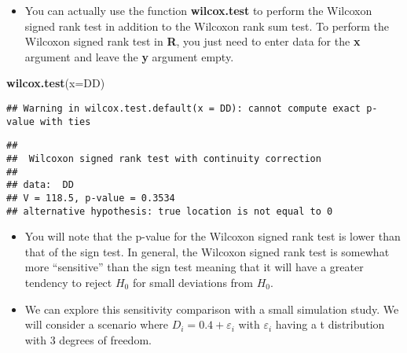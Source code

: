 \documentclass[]{book}
\newenvironment{Shaded}{\begin{snugshade}}{\end{snugshade}}
\newcommand{\DataTypeTok}[1]{\textcolor[rgb]{0.13,0.29,0.53}{#1}}
\newcommand{\KeywordTok}[1]{\textcolor[rgb]{0.13,0.29,0.53}{\textbf{#1}}}
\newcommand{\NormalTok}[1]{#1}
\providecommand{\tightlist}{%
  \setlength{\itemsep}{0pt}\setlength{\parskip}{0pt}}
\begin{document}
\begin{itemize}
\tightlist
\item
  You can actually use the function \textbf{wilcox.test} to perform the Wilcoxon signed rank test in addition
  to the Wilcoxon rank sum test. To perform the Wilcoxon signed rank test in \textbf{R}, you just
  need to enter data for the \textbf{x} argument and leave the \textbf{y} argument empty.
\end{itemize}

\begin{Shaded}
\begin{Highlighting}[]
\KeywordTok{wilcox.test}\NormalTok{(}\DataTypeTok{x=}\NormalTok{DD)}
\end{Highlighting}
\end{Shaded}

\begin{verbatim}
## Warning in wilcox.test.default(x = DD): cannot compute exact p-value with ties
\end{verbatim}

\begin{verbatim}
## 
##  Wilcoxon signed rank test with continuity correction
## 
## data:  DD
## V = 118.5, p-value = 0.3534
## alternative hypothesis: true location is not equal to 0
\end{verbatim}

\begin{itemize}
\item
  You will note that the p-value for the Wilcoxon signed rank test is lower than that
  of the sign test. In general, the Wilcoxon signed rank test is somewhat more ``sensitive''
  than the sign test meaning that it will have a greater tendency
  to reject \(H_{0}\) for small deviations from \(H_{0}\).
\item
  We can explore this sensitivity comparison with a small simulation study. We
  will consider a scenario where \(D_{i} = 0.4 + \varepsilon_{i}\) with \(\varepsilon_{i}\)
  having a t distribution with \(3\) degrees of freedom.
\end{itemize}
\end{document}
